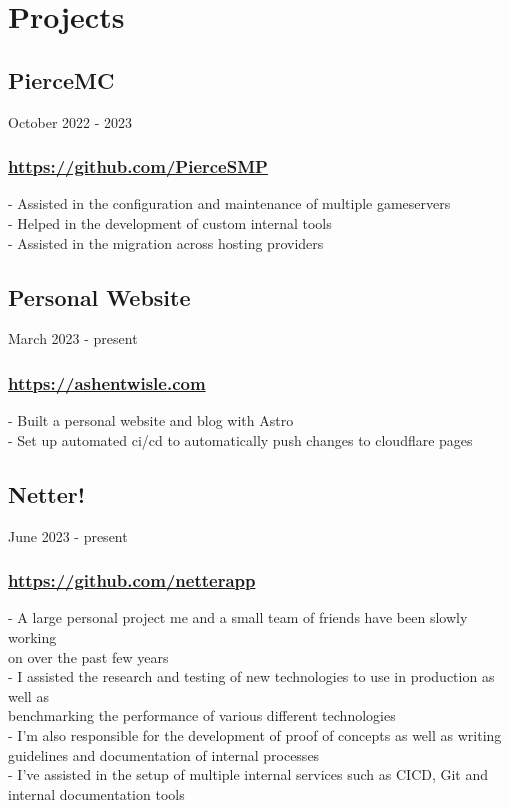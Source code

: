\newpage

\section{Projects}

\subsection{PierceMC} October 2022 - 2023 \\
\subsubsection{\href{https://github.com/PierceSMP}{https://github.com/PierceSMP}}
-\:  Assisted in the configuration and maintenance of multiple gameservers \\
-\:  Helped in the development of custom internal tools \\
-\:  Assisted in the migration across hosting providers \\

\subsection{Personal Website} March 2023 - present \\
\subsubsection{\href{https://ashentwisle.com}{https://ashentwisle.com}}
-\:  Built a personal website and blog with Astro \\
-\:  Set up automated ci/cd to automatically push changes to cloudflare pages \\

\subsection{Netter!} June 2023 - present \\
\subsubsection{\href{https://github.com/netterapp}{https://github.com/netterapp}}
-\:  A large personal project me and a small team of friends have been slowly working \\ 
\ind on over the past few years \\
-\:  I assisted the research and testing of new technologies to use in production as well as \\ 
\ind benchmarking the performance of various different technologies \\
-\:  I'm also responsible for the development of proof of concepts as well as writing \\ 
\ind guidelines and documentation of internal processes \\
-\:  I've assisted in the setup of multiple internal services such as CICD, Git and \\
\ind internal documentation tools\\

